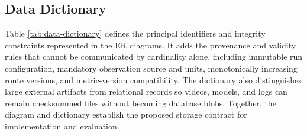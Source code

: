 \subsection{Data Dictionary}

Table \ref{tab:data-dictionary} defines the principal identifiers and integrity constraints represented in the ER diagrams. It adds the provenance and validity rules that cannot be communicated by cardinality alone, including immutable run configuration, mandatory observation source and units, monotonically increasing route versions, and metric-version compatibility. The dictionary also distinguishes large external artifacts from relational records so videos, models, and logs can remain checksummed files without becoming database blobs. Together, the diagram and dictionary establish the proposed storage contract for implementation and evaluation.


